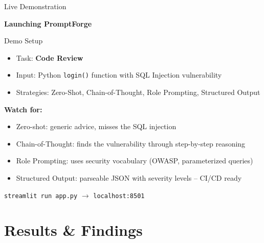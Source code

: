 \documentclass[aspectratio=169, 12pt]{beamer}
\begin{document}
\begin{frame}{Live Demonstration}
  \begin{center}
    \large\textbf{Launching PromptForge}
  \end{center}
  \vspace{0.5em}
  \begin{block}{Demo Setup}
    \begin{itemize}
      \item Task: \textbf{Code Review}
      \item Input: Python \texttt{login()} function with SQL Injection vulnerability
      \item Strategies: Zero-Shot, Chain-of-Thought, Role Prompting, Structured Output
    \end{itemize}
  \end{block}
  \vspace{0.5em}
  \textbf{Watch for:}
  \begin{itemize}
    \item Zero-shot: generic advice, misses the SQL injection
    \item Chain-of-Thought: finds the vulnerability through step-by-step reasoning
    \item Role Prompting: uses security vocabulary (OWASP, parameterized queries)
    \item Structured Output: parseable JSON with severity levels -- CI/CD ready
  \end{itemize}
  \vspace{0.5em}
  \begin{center}
    \texttt{streamlit run app.py} $\rightarrow$ \texttt{localhost:8501}
  \end{center}
\end{frame}

\section{Results \& Findings}
\end{document}
